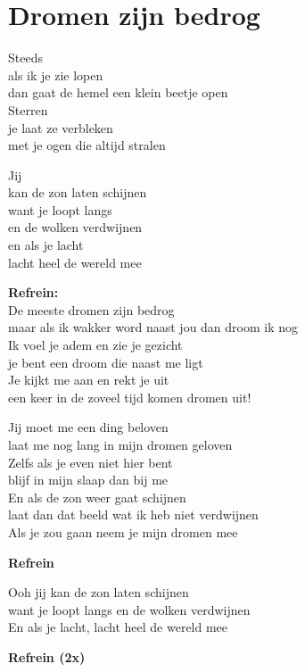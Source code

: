 \section{Dromen zijn bedrog}
Steeds\\
als ik je zie lopen\\
dan gaat de hemel een klein beetje open\\
Sterren\\
je laat ze verbleken\\
met je ogen die altijd stralen

Jij\\
kan de zon laten schijnen\\
want je loopt langs\\
en de wolken verdwijnen\\
en als je lacht\\
lacht heel de wereld mee

\textbf{Refrein:}\\
De meeste dromen zijn bedrog\\
maar als ik wakker word naast jou dan droom ik nog\\
Ik voel je adem en zie je gezicht\\
je bent een droom die naast me ligt\\
Je kijkt me aan en rekt je uit\\
een keer in de zoveel tijd komen dromen uit!

Jij moet me een ding beloven\\
laat me nog lang in mijn dromen geloven\\
Zelfs als je even niet hier bent\\
blijf in mijn slaap dan bij me\\
En als de zon weer gaat schijnen\\
laat dan dat beeld wat ik heb niet verdwijnen\\
Als je zou gaan neem je mijn dromen mee

\textbf{Refrein}

Ooh jij kan de zon laten schijnen\\
want je loopt langs en de wolken verdwijnen\\
En als je lacht, lacht heel de wereld mee

\textbf{Refrein (2x)}
